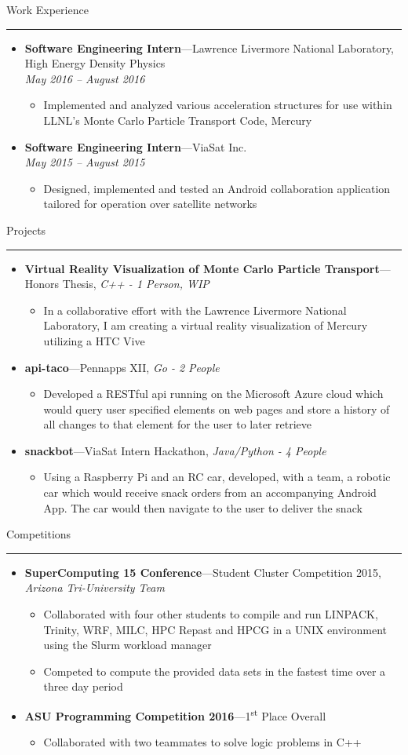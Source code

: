 \documentclass[10pt,oneside]{article}
\newcommand{\sectitle}[1]{
	\begin{flushleft}{\selectfont\Large#1}\end{flushleft}
}
\newenvironment{ressection}[1]{
	\vspace{2pt}
	\sectitle{#1}
	\vspace{-10pt}\rule{\textwidth}{0.5pt}
	\vspace{-10pt}
	\begin{itemize}
	\vspace{3pt}
}{
	\end{itemize}
}
\newcommand{\ressubitem}[1]{
	\vspace{-1pt}
	\item \begin{flushleft} #1 \end{flushleft}
}
\newcommand{\resmeditem}[2]{
	\vspace{-5pt}
	\item
	\textbf{#1}---#2
}
\newcommand{\resbigitemline}[3]{
	\vspace{-5pt}
	\item
	\textbf{#1}---#2, 
	\textit{#3}
}
\newcommand{\resbigitem}[3]{
	\vspace{-5pt}
	\item
	\textbf{#1}---#2 \\
	\textit{#3}
}
\newenvironment{ressubsec}[3]{
	\resbigitem{#1}{#2}{#3}
	\vspace{-4pt}
	\begin{itemize}
}{
	\end{itemize}
}
\newenvironment{ressubsecshort}[2]{
	\resmeditem{#1}{#2}
	\vspace{-4pt}
	\begin{itemize}
	}{
	\end{itemize}
}
\newenvironment{ressubsecline}[3]{
	\resbigitemline{#1}{#2}{#3}
	\vspace{-2pt}
	\begin{itemize}
}{
	\end{itemize}
}
\begin{document}
\begin{ressection}{Work Experience}
	\begin{ressubsec}{Software Engineering Intern}{Lawrence Livermore National Laboratory, High Energy Density Physics}{May 2016 -- August 2016}
    \ressubitem{Implemented and analyzed various acceleration structures for use within LLNL's Monte Carlo Particle Transport Code, Mercury}
  \end{ressubsec}
	
  \begin{ressubsec}{Software Engineering Intern}{ViaSat Inc.}{May 2015 -- August 2015}
    \ressubitem{Designed, implemented and tested an Android collaboration application tailored for operation over satellite networks}
  \end{ressubsec}

\end{ressection}



\begin{ressection}{Projects}
	\begin{ressubsecline}{Virtual Reality Visualization of Monte Carlo Particle Transport}{Honors Thesis}{C++ - 1 Person, WIP}
		\ressubitem{In a collaborative effort with the Lawrence Livermore National Laboratory, I am creating a virtual reality visualization of Mercury utilizing a HTC Vive}
	\end{ressubsecline}
	\begin{ressubsecline}{api-taco}{Pennapps XII}{Go - 2 People}
		\ressubitem{Developed a RESTful api running on the Microsoft Azure cloud which would query user specified
		elements on web pages and store a history of all changes to that element for the user to later retrieve}
	\end{ressubsecline}
	\begin{ressubsecline}{snackbot}{ViaSat Intern Hackathon}{Java/Python - 4 People}
		\ressubitem{Using a Raspberry Pi and an RC car, developed, with a team, a robotic car which would receive snack
		orders from an accompanying Android App. The car would then navigate to the user to deliver the snack}
	\end{ressubsecline}
\end{ressection}



\begin{ressection}{Competitions}
	\begin{ressubsecline}{SuperComputing 15 Conference}{Student Cluster Competition 2015}{Arizona Tri-University Team}
		\ressubitem{Collaborated with four other students to compile and run LINPACK, Trinity, WRF, MILC, HPC Repast and
		HPCG in a UNIX environment using the Slurm workload manager}
	\ressubitem{Competed to compute the provided data sets in the fastest time over a three day period}
	\end{ressubsecline}
	\begin{ressubsecshort}{ASU Programming Competition 2016}{1\textsuperscript{st} Place Overall}
		\ressubitem{Collaborated with two teammates to solve logic problems in C++}
	\end{ressubsecshort}
\end{ressection}
\end{document}
